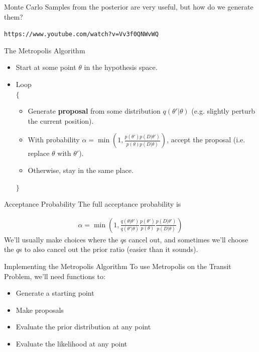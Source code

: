 \begin{frame}[t]{Monte Carlo}
Samples from the posterior are very useful, but how do we generate them?

\begin{center}
{\tt https://www.youtube.com/watch?v=Vv3f0QNWvWQ}
\end{center}

\end{frame}



\begin{frame}[t]{The Metropolis Algorithm}

\begin{itemize}
\item Start at some point $\theta$ in the hypothesis space.
\item Loop\\
$\{$
  \begin{itemize}
  \item Generate {\bf proposal} from some distribution $q(\theta' | \theta)$
  (e.g. slightly perturb the current position).
  \item With probability $\alpha = \min\left(1, \frac{p(\theta')p(D|\theta')}{p(\theta)p(D|\theta)}\right)$, accept the proposal (i.e. replace $\theta$ with $\theta'$).
  \item Otherwise, stay in the same place.
  \end{itemize}
$\}$
\end{itemize}
\end{frame}

\begin{frame}[t]{Acceptance Probability}
The full acceptance probability is

\begin{eqnarray}
\alpha =
\min\left(1, \frac{q(\theta|\theta')}{q(\theta'|\theta)}\frac{p(\theta')}{p(\theta)}\frac{p(D|\theta')}{p(D|\theta)}\right)
\end{eqnarray}
We'll usually make choices where the $q$s cancel out, and sometimes we'll
choose the $q$s to also cancel out the prior ratio (easier than it sounds).
\end{frame}



\begin{frame}[t]{Implementing the Metropolis Algorithm}
To use Metropolis on the Transit Problem, we'll need functions to:
\begin{itemize}
\item Generate a starting point
\item Make proposals
\item Evaluate the prior distribution at any point
\item Evaluate the likelihood at any point
\end{itemize}
\end{frame}



